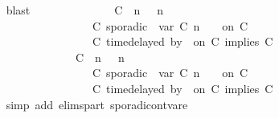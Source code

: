 \begin{isabellebody}
\ \ \ \ \ \ \ \ \ \ \ \ \isamarkupfalse%
\ blast\isanewline
\ \ \ \ \ \ \ \ \ \ \isamarkupfalse%
\ \isamarkupfalse%
\ {\isacartoucheopen}{\isacharparenleft}\ {\isacharparenleft}{\isacharparenleft}C\ {\isasymUp}\ n{\isacharparenright}\ {\isacharhash}\ {\isasymGamma}{\isacharparenright}{\isacharcomma}\ n\isanewline
\ \ \ \ \ \ \ \ \ \ \ \ \ \ \ \ \ \ \ \ \ \ \ \ \ \ \ \ {\isasymturnstile}\ {\isacharparenleft}C\ sporadic{\isasymsharp}\ {\isasymlparr}\ {\isasymtau}\isactrlsub v\isactrlsub a\isactrlsub r\ {\isacharparenleft}C\ n{\isacharparenright}\ {\isasymoplus}\ {\isasymdelta}{\isasymtau}\ {\isasymrparr}\ on\ C\ {\isacharhash}\ {\isasymPsi}\isanewline
\ \ \ \ \ \ \ \ \ \ \ \ \ \ \ \ \ \ \ \ \ \ \ \ \ \ \ \ {\isasymtriangleright}\ {\isacharparenleft}{\isacharparenleft}C\ time{\isacharminus}delayed{\isasymbowtie}\ by\ {\isasymdelta}{\isasymtau}\ on\ C\ implies\ C\ {\isacharhash}\ {\isasymPhi}{\isacharparenright}{\isacharparenright}\isanewline
\ \ \ \ \ \ \ \ \ \ \ \ \ \ \ \ \ \ \ \ \ \ \ \ {\isasymhookrightarrow}\ {\isacharparenleft}\ {\isacharparenleft}{\isacharparenleft}C\ {\isasymUp}\ n{\isacharparenright}\ {\isacharhash}\ {\isasymGamma}{\isacharparenright}{\isacharcomma}\ n\isanewline
\ \ \ \ \ \ \ \ \ \ \ \ \ \ \ \ \ \ \ \ \ \ \ \ \ \ \ \ {\isasymturnstile}\ {\isasymPsi}\isanewline
\ \ \ \ \ \ \ \ \ \ \ \ \ \ \ \ \ \ \ \ \ \ \ \ \ \ \ \ {\isasymtriangleright}\ {\isacharparenleft}{\isacharparenleft}C\ sporadic{\isasymsharp}\ {\isasymlparr}\ {\isasymtau}\isactrlsub v\isactrlsub a\isactrlsub r\ {\isacharparenleft}C\ n{\isacharparenright}\ {\isasymoplus}\ {\isasymdelta}{\isasymtau}\ {\isasymrparr}\ on\ C\isanewline
\ \ \ \ \ \ \ \ \ \ \ \ \ \ \ \ \ \ \ \ \ \ \ \ \ \ \ \ {\isacharhash}\ {\isacharparenleft}C\ time{\isacharminus}delayed{\isasymbowtie}\ by\ {\isasymdelta}{\isasymtau}\ on\ C\ implies\ C\ {\isacharhash}\ {\isasymPhi}{\isacharparenright}{\isacharparenright}{\isacartoucheclose}\isanewline
\ \ \ \ \ \ \ \ \ \ \ \ \isamarkupfalse%
\ {\isacharparenleft}simp\ add{\isacharcolon}\ elims{\isacharunderscore}part\ sporadic{\isacharunderscore}on{\isacharunderscore}tvar{\isacharunderscore}e{}{\isacharparenright}\isanewline

\end{isabellebody}
